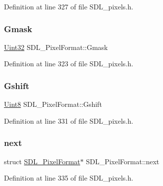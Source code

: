 Definition at line 327 of file S\+D\+L\+\_\+pixels.\+h.

\mbox{\label{struct_s_d_l___pixel_format_a3d07a81b430202c6ea0089d8df8f4e15}} 
\subsubsection{\texorpdfstring{Gmask}{Gmask}}
{\footnotesize\ttfamily \mbox{\hyperlink{_s_d_l__stdinc_8h_add440eff171ea5f55cb00c4a9ab8672d}{Uint32}} S\+D\+L\+\_\+\+Pixel\+Format\+::\+Gmask}



Definition at line 323 of file S\+D\+L\+\_\+pixels.\+h.

\mbox{\label{struct_s_d_l___pixel_format_a6045012f994c02a86bdc4a91b28d2a3c}} 
\subsubsection{\texorpdfstring{Gshift}{Gshift}}
{\footnotesize\ttfamily \mbox{\hyperlink{_s_d_l__stdinc_8h_a2944638813a090aa23e62f4da842c3e2}{Uint8}} S\+D\+L\+\_\+\+Pixel\+Format\+::\+Gshift}



Definition at line 331 of file S\+D\+L\+\_\+pixels.\+h.

\mbox{\label{struct_s_d_l___pixel_format_a1953b66c817116bf81bae4873ee6bce5}} 
\subsubsection{\texorpdfstring{next}{next}}
{\footnotesize\ttfamily struct \mbox{\hyperlink{struct_s_d_l___pixel_format}{S\+D\+L\+\_\+\+Pixel\+Format}}$\ast$ S\+D\+L\+\_\+\+Pixel\+Format\+::next}



Definition at line 335 of file S\+D\+L\+\_\+pixels.\+h.

\mbox{\label{struct_s_d_l___pixel_format_a1f4e276fbda82e60eaff28f61c7cd19e}} 
